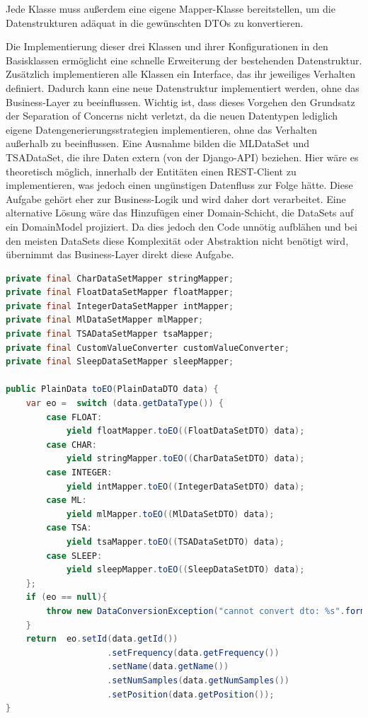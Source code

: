 Jede Klasse muss außerdem eine eigene Mapper-Klasse bereitstellen, um die Datenstrukturen adäquat in die gewünschten DTOs zu konvertieren.

Die Implementierung dieser drei Klassen und ihrer Konfigurationen in den Basisklassen ermöglicht eine schnelle Erweiterung der bestehenden Datenstruktur. Zusätzlich implementieren alle Klassen ein Interface, das ihr jeweiliges Verhalten definiert. 
Dadurch kann eine neue Datenstruktur implementiert werden, ohne das Business-Layer zu beeinflussen. Wichtig ist, dass dieses Vorgehen den Grundsatz der Separation of Concerns nicht verletzt, da die neuen Datentypen lediglich eigene Datengenerierungsstrategien
implementieren, ohne das Verhalten außerhalb zu beeinflussen. Eine Ausnahme bilden die MLDataSet und TSADataSet, die ihre Daten extern (von der Django-API) beziehen. Hier wäre es theoretisch möglich, innerhalb der Entitäten einen REST-Client zu implementieren, 
was jedoch einen ungünstigen Datenfluss zur Folge hätte. Diese Aufgabe gehört eher zur Business-Logik und wird daher dort verarbeitet. Eine alternative Lösung wäre das Hinzufügen einer Domain-Schicht, die DataSets auf ein DomainModel projiziert. Da dies jedoch den 
Code unnötig aufblähen und bei den meisten DataSets diese Komplexität oder Abstraktion nicht benötigt wird, übernimmt das Business-Layer direkt diese Aufgabe.



\begin{lstlisting}[language=Java, caption={Mapper Klasse für DataSets, basierend auf den dataType, ein separates enum, fügen die Datentype eigenen mapper ihre Felder hinzu, bevor die global gültigen Felder gefüllt werden.}, label={code:javaBaseDataMapping}]
private final CharDataSetMapper stringMapper;
private final FloatDataSetMapper floatMapper;
private final IntegerDataSetMapper intMapper;
private final MlDataSetMapper mlMapper;
private final TSADataSetMapper tsaMapper;
private final CustomValueConverter customValueConverter;
private final SleepDataSetMapper sleepMapper;

public PlainData toEO(PlainDataDTO data) {
    var eo =  switch (data.getDataType()) {
        case FLOAT:
            yield floatMapper.toEO((FloatDataSetDTO) data);
        case CHAR:
            yield stringMapper.toEO((CharDataSetDTO) data);
        case INTEGER:
            yield intMapper.toEO((IntegerDataSetDTO) data);
        case ML:
            yield mlMapper.toEO((MlDataSetDTO) data);
        case TSA:
            yield tsaMapper.toEO((TSADataSetDTO) data);
        case SLEEP:
            yield sleepMapper.toEO((SleepDataSetDTO) data);
    };
    if (eo == null){
        throw new DataConversionException("cannot convert dto: %s".formatted(data));
    }
    return  eo.setId(data.getId())
                    .setFrequency(data.getFrequency())
                    .setName(data.getName())
                    .setNumSamples(data.getNumSamples())
                    .setPosition(data.getPosition());
}
\end{lstlisting}  


